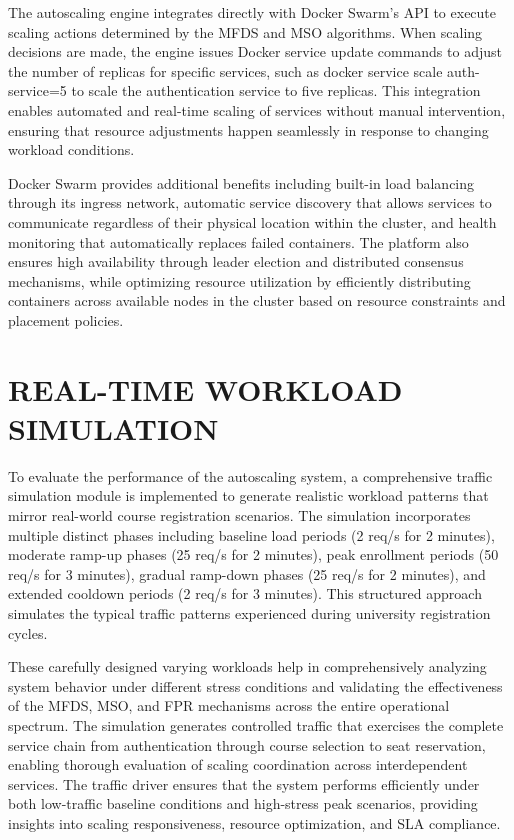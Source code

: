 The autoscaling engine integrates directly with Docker Swarm's API to execute scaling actions determined by the MFDS and MSO algorithms. When scaling decisions are made, the engine issues Docker service update commands to adjust the number of replicas for specific services, such as docker service scale auth-service=5 to scale the authentication service to five replicas. This integration enables automated and real-time scaling of services without manual intervention, ensuring that resource adjustments happen seamlessly in response to changing workload conditions.

Docker Swarm provides additional benefits including built-in load balancing through its ingress network, automatic service discovery that allows services to communicate regardless of their physical location within the cluster, and health monitoring that automatically replaces failed containers. The platform also ensures high availability through leader election and distributed consensus mechanisms, while optimizing resource utilization by efficiently distributing containers across available nodes in the cluster based on resource constraints and placement policies.

\section{REAL-TIME WORKLOAD SIMULATION}

To evaluate the performance of the autoscaling system, a comprehensive traffic simulation module is implemented to generate realistic workload patterns that mirror real-world course registration scenarios. The simulation incorporates multiple distinct phases including baseline load periods (2 req/s for 2 minutes), moderate ramp-up phases (25 req/s for 2 minutes), peak enrollment periods (50 req/s for 3 minutes), gradual ramp-down phases (25 req/s for 2 minutes), and extended cooldown periods (2 req/s for 3 minutes). This structured approach simulates the typical traffic patterns experienced during university registration cycles.

These carefully designed varying workloads help in comprehensively analyzing system behavior under different stress conditions and validating the effectiveness of the MFDS, MSO, and FPR mechanisms across the entire operational spectrum. The simulation generates controlled traffic that exercises the complete service chain from authentication through course selection to seat reservation, enabling thorough evaluation of scaling coordination across interdependent services. The traffic driver ensures that the system performs efficiently under both low-traffic baseline conditions and high-stress peak scenarios, providing insights into scaling responsiveness, resource optimization, and SLA compliance.

